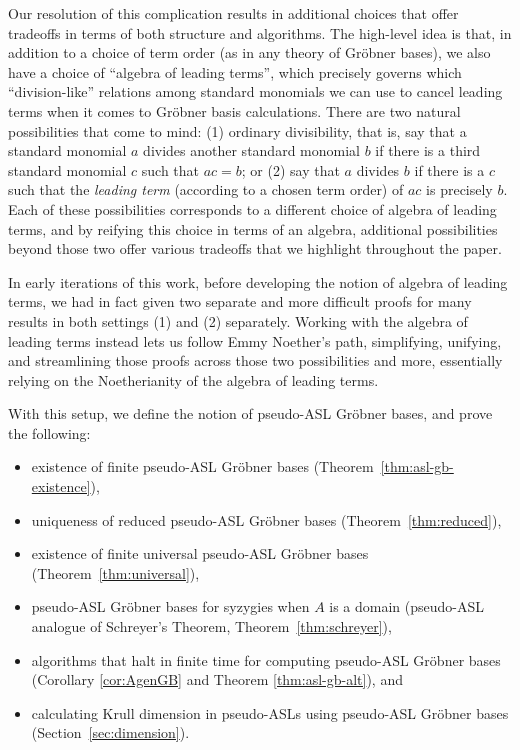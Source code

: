 \documentclass[11pt,reqno]{amsart}
\newcommand{\gb}{Gr\"{o}bner }
\theoremstyle{definition}
\numberwithin{equation}{section}
\begin{document}
Our resolution of this complication results in additional choices that offer tradeoffs in terms of both structure and algorithms. The high-level idea is that, in addition to a choice of term order (as in any theory of Gröbner bases), we also have a choice of ``algebra of leading terms'', which precisely governs which ``division-like'' relations among standard monomials we can use to cancel leading terms when it comes to Gröbner basis calculations. There are two natural possibilities that come to mind: (1) ordinary divisibility, that is, say that a standard monomial $a$ divides another standard monomial $b$ if there is a third standard monomial $c$ such that $ac=b$; or (2) say that $a$ divides $b$ if there is a $c$ such that the \emph{leading term} (according to a chosen term order) of $ac$ is precisely $b$. Each of these possibilities corresponds to a different choice of algebra of leading terms, and by reifying this choice in terms of an algebra, additional possibilities beyond those two offer various tradeoffs that we highlight throughout the paper.

In early iterations of this work, before developing the notion of algebra of leading terms, we had in fact given two separate and more difficult proofs for many results in both settings (1) and (2) separately. Working with the algebra of leading terms instead lets us follow Emmy Noether's path, simplifying, unifying, and streamlining those proofs across those two possibilities and more, essentially relying on the Noetherianity of the algebra of leading terms.

With this setup, we define the notion of pseudo-ASL \gb bases, and prove the following:
\begin{itemize}
\item existence of finite pseudo-ASL Gröbner bases (Theorem~\ref{thm:asl-gb-existence}),
\item uniqueness of reduced pseudo-ASL Gröbner bases (Theorem~\ref{thm:reduced}),
\item existence of finite universal pseudo-ASL \gb bases (Theorem~\ref{thm:universal}),
\item pseudo-ASL \gb bases for syzygies when $A$ is a domain (pseudo-ASL analogue of Schreyer's Theorem, Theorem~\ref{thm:schreyer}),
\item algorithms that halt in finite time for computing pseudo-ASL Gröbner bases (Corollary \ref{cor:AgenGB} and Theorem \ref{thm:asl-gb-alt}), and
\item calculating Krull dimension in pseudo-ASLs using pseudo-ASL \gb bases (Section~\ref{sec:dimension}).
\end{itemize}
\end{document}
